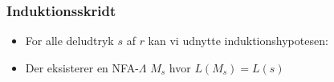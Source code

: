 \begin{frame}
\frametitle{Induktionsskridt}
\begin{itemize}[<+->]
\item For alle deludtryk $s$ af $r$ kan vi udnytte induktionshypotesen:
\item Der eksisterer en NFA-$\Lambda$ $M_s$ hvor $L(M_s)=L(s)$
\end{itemize}

\begin{columns}
\column{5cm}
\column{5cm}
\end{columns}
\end{frame}

